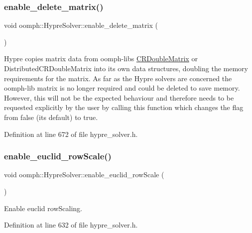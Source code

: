 \subsubsection{\texorpdfstring{enable\+\_\+delete\+\_\+matrix()}{enable\_delete\_matrix()}}
{\footnotesize\ttfamily void oomph\+::\+Hypre\+Solver\+::enable\+\_\+delete\+\_\+matrix (\begin{DoxyParamCaption}{ }\end{DoxyParamCaption})\hspace{0.3cm}{\ttfamily [inline]}}



Hypre copies matrix data from oomph-\/lib\textquotesingle{}s \hyperlink{classoomph_1_1CRDoubleMatrix}{C\+R\+Double\+Matrix} or Distributed\+C\+R\+Double\+Matrix into its own data structures, doubling the memory requirements for the matrix. As far as the Hypre solvers are concerned the oomph-\/lib matrix is no longer required and could be deleted to save memory. However, this will not be the expected behaviour and therefore needs to be requested explicitly by the user by calling this function which changes the flag from false (its default) to true. 



Definition at line 672 of file hypre\+\_\+solver.\+h.

\mbox{\label{classoomph_1_1HypreSolver_a8a96671322af214937d924546633648f}} 
\subsubsection{\texorpdfstring{enable\+\_\+euclid\+\_\+row\+Scale()}{enable\_euclid\_rowScale()}}
{\footnotesize\ttfamily void oomph\+::\+Hypre\+Solver\+::enable\+\_\+euclid\+\_\+row\+Scale (\begin{DoxyParamCaption}{ }\end{DoxyParamCaption})\hspace{0.3cm}{\ttfamily [inline]}}



Enable euclid row\+Scaling. 



Definition at line 632 of file hypre\+\_\+solver.\+h.

